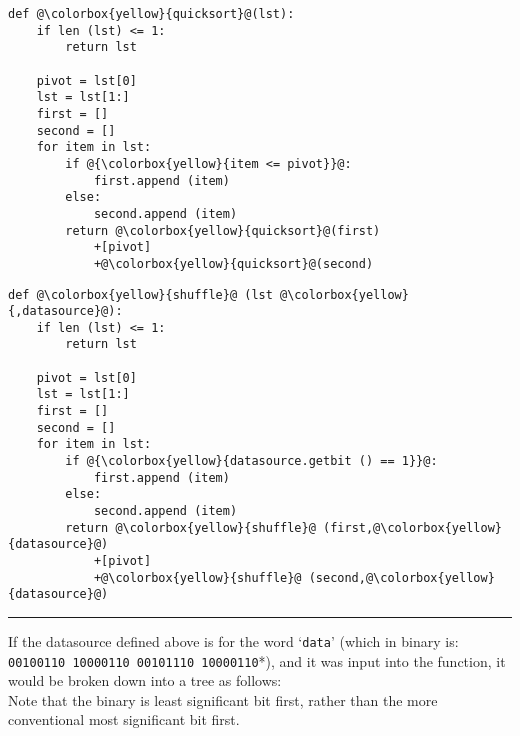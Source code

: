 {\setlength\multicolsep{0pt}
\begin{multicols}{2}
\begin{lstlisting}
def @\colorbox{yellow}{quicksort}@(lst):
    if len (lst) <= 1:
        return lst

    pivot = lst[0]
    lst = lst[1:]
    first = []
    second = []
    for item in lst:
        if @{\colorbox{yellow}{item <= pivot}}@:
            first.append (item)
        else:
            second.append (item)
        return @\colorbox{yellow}{quicksort}@(first)
            +[pivot]
            +@\colorbox{yellow}{quicksort}@(second)
\end{lstlisting}
\begin{lstlisting}
def @\colorbox{yellow}{shuffle}@ (lst @\colorbox{yellow}{,datasource}@):
    if len (lst) <= 1: 
        return lst 

    pivot = lst[0]
    lst = lst[1:]
    first = []
    second = []
    for item in lst:
        if @{\colorbox{yellow}{datasource.getbit () == 1}}@:
            first.append (item)
        else:
            second.append (item)
        return @\colorbox{yellow}{shuffle}@ (first,@\colorbox{yellow}{datasource}@)
            +[pivot]
            +@\colorbox{yellow}{shuffle}@ (second,@\colorbox{yellow}{datasource}@)
\end{lstlisting}
\end{multicols}}
\hrule
\newpage
If the datasource defined above is for the word `\texttt{data}' (which in binary is:
\texttt{00100110 10000110 00101110 10000110}*), and it was input into the function, it would be broken down into a tree as follows:\\
{\tiny *Note that the binary is least significant bit first, rather than the more conventional most significant bit first.}


